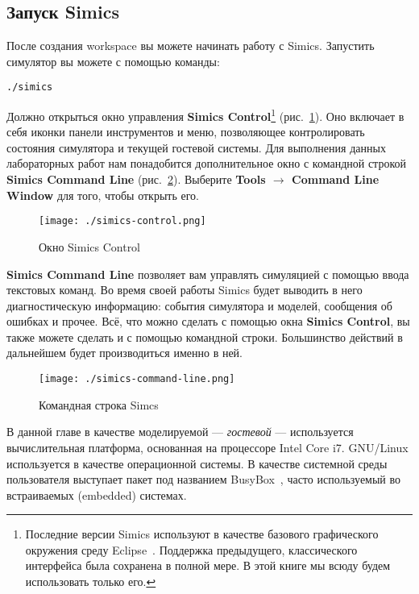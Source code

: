 \subsection{Запуск Simics}

После создания workspace вы можете начинать работу с Simics. Запустить симулятор вы можете с помощью команды:

\begin{lstlisting}
./simics
\end{lstlisting}

Должно открыться окно управления \textbf{Simics Control}\footnote{Последние версии Simics используют в качестве базового графического окружения среду Eclipse~\cite{eclipse}. Поддержка предыдущего, классического интерфейса была сохранена в полной мере. В этой книге мы всюду будем использовать только его.} (рис.~\ref{fig:simics-control}). Оно включает в себя иконки панели инструментов и меню, позволяющее контролировать состояния симулятора и текущей гостевой системы. Для выполнения данных лабораторных работ нам понадобится дополнительное окно с командной строкой \textbf{Simics Command Line} (рис.~\ref{fig:simics-command-line}). Выберите \textbf{Tools $\to$ Command Line Window} для того, чтобы открыть его.

\begin{figure}[ht]
    \centering
    \texttt{[image: ./simics-control.png]}
    \caption{Окно Simics Control}
    \label{fig:simics-control}
\end{figure}

\textbf{Simics Command Line} позволяет вам управлять симуляцией с помощью ввода текстовых команд. Во время своей работы Simics будет выводить в него диагностическую информацию: события симулятора и моделей, сообщения об ошибках и прочее. Всё, что можно сделать с помощью окна \textbf{Simics Control}, вы также можете сделать и с помощью командной строки. Большинство действий в дальнейшем будет производиться именно в ней.

\begin{figure}[ht]
    \centering
    \texttt{[image: ./simics-command-line.png]}
    \caption{Командная строка Simcs}
    \label{fig:simics-command-line}
\end{figure}

В данной главе в качестве моделируемой --- \textit{гостевой} --- используется вычислительная платформа, основанная на процессоре Intel\textsuperscript{\textregistered} Core\textsuperscript{\texttrademark} i7. GNU/Linux используется в качестве операционной системы. В качестве системной среды пользователя выступает пакет под названием BusyBox~\cite{BusyBox}, часто используемый во встраиваемых (\abbr embedded) системах.

